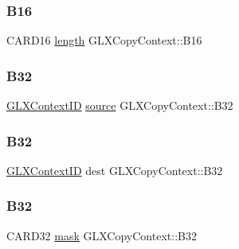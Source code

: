\subsubsection{\texorpdfstring{B16}{B16}}
{\footnotesize\ttfamily C\+A\+R\+D16 \hyperlink{glcorearb_8h_ab9c919755bde3b34349e23a32b4e0fa7}{length} G\+L\+X\+Copy\+Context\+::\+B16}

\mbox{\label{struct_g_l_x_copy_context_abf62334255d39f0d1cf080f0bf06ad39}} 
\subsubsection{\texorpdfstring{B32}{B32}\hspace{0.1cm}{\footnotesize\ttfamily [1/4]}}
{\footnotesize\ttfamily \hyperlink{glx_8h_a17c7ca5b76cc448032df0b5352803005}{G\+L\+X\+Context\+ID} \hyperlink{glcorearb_8h_a633906574fe6e39b7f2840bed0e49832}{source} G\+L\+X\+Copy\+Context\+::\+B32}

\mbox{\label{struct_g_l_x_copy_context_a8cffcb03f29cf3939019dc822c2f2950}} 
\subsubsection{\texorpdfstring{B32}{B32}\hspace{0.1cm}{\footnotesize\ttfamily [2/4]}}
{\footnotesize\ttfamily \hyperlink{glx_8h_a17c7ca5b76cc448032df0b5352803005}{G\+L\+X\+Context\+ID} dest G\+L\+X\+Copy\+Context\+::\+B32}

\mbox{\label{struct_g_l_x_copy_context_a0a210ec5717ca3b5616d287932dcd3a9}} 
\subsubsection{\texorpdfstring{B32}{B32}\hspace{0.1cm}{\footnotesize\ttfamily [3/4]}}
{\footnotesize\ttfamily C\+A\+R\+D32 \hyperlink{glcorearb_8h_a2e8825c19147a8250013df8e4275f5b6}{mask} G\+L\+X\+Copy\+Context\+::\+B32}

